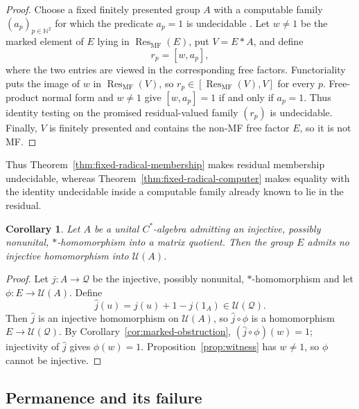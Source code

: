 \documentclass[11pt]{amsart}
\newcommand{\leanverified}[2]{\ignorespaces}
\newtheorem{corollary}[theorem]{Corollary}
\theoremstyle{definition}
\theoremstyle{remark}
\theoremstyle{plain}
\newcommand{\N}{\mathbb N}
\newcommand{\U}{\mathcal U}
\begin{document}
\begin{proof}
Choose a fixed finitely presented group $A$ with a computable family
$(a_p)_{p\in\N^2}$ for which the predicate $a_p=1$ is undecidable
\cite{Boone}.  Let $w\ne1$ be the marked element of $E$ lying in
$\operatorname{Res}_{\mathrm{MF}}(E)$, put $V=E*A$, and define
\[
 r_p=[w,a_p],
\]
where the two entries are viewed in the corresponding free factors.
Functoriality puts the image of $w$ in
$\operatorname{Res}_{\mathrm{MF}}(V)$, so
$r_p\in[\operatorname{Res}_{\mathrm{MF}}(V),V]$ for every $p$.
Free-product normal form and $w\ne1$ give
$[w,a_p]=1$ if and only if $a_p=1$.  Thus identity testing on the promised
residual-valued family $(r_p)$ is undecidable.  Finally, $V$ is finitely
presented and contains the non-MF free factor $E$, so it is not MF.
\end{proof}

Thus Theorem~\ref{thm:fixed-radical-membership} makes residual membership
undecidable, whereas Theorem~\ref{thm:fixed-radical-computer} makes equality
with the identity undecidable inside a computable family already known to
lie in the residual.

\begin{corollary}\label{cor:nofaithful}
Let $A$ be a unital $C^*$-algebra admitting an injective, possibly
nonunital, $*$-homomorphism into a matrix quotient.  Then the group $E$
admits no injective homomorphism into $\U(A)$.
\leanverified{Sofic/LiteralNonMFConsequences}{GroupApproximation.LiteralNonMFConsequences.literal_no_faithful_corona_subalgebra_target}
\end{corollary}

\begin{proof}
Let $j\colon A\to\mathcal Q$ be the injective, possibly nonunital,
$*$-homomorphism and let $\phi\colon E\to\U(A)$.  Define
\[
   \widehat j(u)=j(u)+1-j(1_A)\in\U(\mathcal Q).
\]
Then \(\widehat j\) is an injective homomorphism on \(\U(A)\), so
\(\widehat j\circ\phi\) is a homomorphism \(E\to\U(\mathcal Q)\).
By Corollary~\ref{cor:marked-obstruction}, \((\widehat j\circ\phi)(w)=1\); injectivity
of \(\widehat j\) gives \(\phi(w)=1\).  Proposition~\ref{prop:witness} has
\(w\neq1\), so \(\phi\) cannot be injective.
\end{proof}

\subsection{Permanence and its failure}
\end{document}
